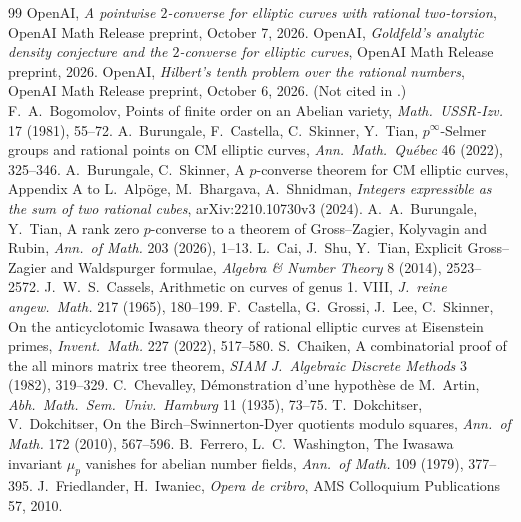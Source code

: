\documentclass[11pt]{article}
\theoremstyle{remark}
\begin{document}
\begin{thebibliography}{99}\small
{} OpenAI, \emph{A pointwise $2$-converse for elliptic curves with
rational two-torsion}, OpenAI Math Release preprint, October 7, 2026.
 OpenAI, \emph{Goldfeld's analytic density conjecture and
the $2$-converse for elliptic curves}, OpenAI Math Release preprint, 2026.
 OpenAI, \emph{Hilbert's tenth problem over the rational numbers},
OpenAI Math Release preprint, October 6, 2026. (Not cited in \cite{P2C}.)
 F.~A.~Bogomolov, Points of finite order on an
Abelian variety, \emph{Math.\ USSR-Izv.} 17 (1981), 55--72.
 A.~Burungale, F.~Castella,
C.~Skinner, Y.~Tian, $p^\infty$-Selmer groups and rational points on CM
elliptic curves, \emph{Ann.\ Math.\ Qu\'ebec} 46 (2022), 325--346.
 A.~Burungale, C.~Skinner, A
$p$-converse theorem for CM elliptic curves, Appendix A to L.~Alp\"oge,
M.~Bhargava, A.~Shnidman, \emph{Integers expressible as the sum of two
rational cubes}, arXiv:2210.10730v3 (2024).
 A.~A.~Burungale, Y.~Tian, A rank zero $p$-converse
to a theorem of Gross--Zagier, Kolyvagin and Rubin, \emph{Ann.\ of Math.} 203
(2026), 1--13.
 L.~Cai, J.~Shu, Y.~Tian, Explicit Gross--Zagier and
Waldspurger formulae, \emph{Algebra \& Number Theory} 8 (2014), 2523--2572.
 J.~W.~S.~Cassels, Arithmetic on curves of genus 1. VIII,
\emph{J.\ reine angew.\ Math.} 217 (1965), 180--199.
 F.~Castella, G.~Grossi, J.~Lee, C.~Skinner, On the
anticyclotomic Iwasawa theory of rational elliptic curves at Eisenstein
primes, \emph{Invent.\ Math.} 227 (2022), 517--580.
 S.~Chaiken, A combinatorial proof of the all minors
matrix tree theorem, \emph{SIAM J.\ Algebraic Discrete Methods} 3 (1982),
319--329.
 C.~Chevalley, D\'emonstration d'une hypoth\`ese de
M.~Artin, \emph{Abh.\ Math.\ Sem.\ Univ.\ Hamburg} 11 (1935), 73--75.
 T.~Dokchitser, V.~Dokchitser, On the
Birch--Swinnerton-Dyer quotients modulo squares, \emph{Ann.\ of Math.} 172
(2010), 567--596.
 B.~Ferrero, L.~C.~Washington, The Iwasawa
invariant $\mu_p$ vanishes for abelian number fields, \emph{Ann.\ of Math.}
109 (1979), 377--395.
 J.~Friedlander, H.~Iwaniec, \emph{Opera de
cribro}, AMS Colloquium Publications 57, 2010.

\end{thebibliography}
\end{document}
